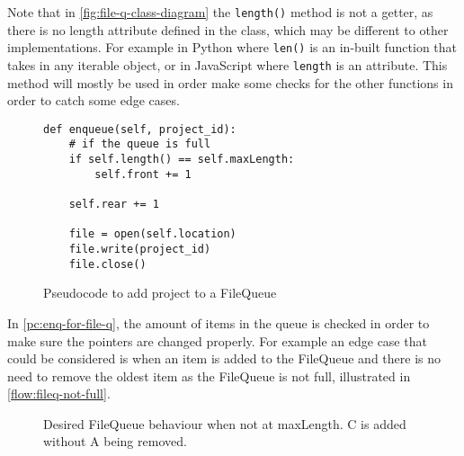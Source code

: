         Note that in \autoref{fig:file-q-class-diagram} the \verb|length()| method is not a getter, as there is no length attribute defined in the class, which may be different to other implementations. For example in Python where \verb|len()| is an in-built function that takes in any iterable object, or in JavaScript where \verb|length| is an attribute. This method will mostly be used in order make some checks for the other functions in order to catch some edge cases. 

        \begin{figure}[!ht]
            \begin{verbatim}
def enqueue(self, project_id):
    # if the queue is full
    if self.length() == self.maxLength:
        self.front += 1

    self.rear += 1

    file = open(self.location)
    file.write(project_id)
    file.close()
            \end{verbatim}
            \caption{Pseudocode to add project to a FileQueue}
            \label{pc:enq-for-file-q}
        \end{figure}

        In \autoref{pc:enq-for-file-q}, the amount of items in the queue is checked in order to make sure the pointers are changed properly. For example an edge case that could be considered is when an item is added to the FileQueue and there is no need to remove the oldest item as the FileQueue is not full, illustrated in \autoref{flow:fileq-not-full}.

        \begin{figure}[!ht]
            \centering
            \caption{Desired FileQueue behaviour when not at maxLength. C is added without A being removed.}
            \label{flow:fileq-not-full}
        \end{figure}

